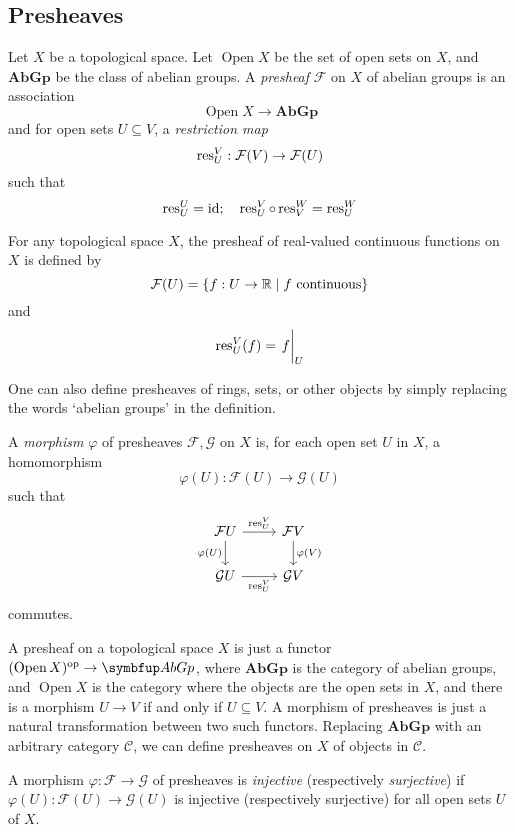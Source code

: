 \subsection{Presheaves}
\begin{definition}
    Let \( X \) be a topological space.
    Let \( \operatorname{Open} X \) be the set of open sets on \( X \), and \( \mathbf{AbGp} \) be the class of abelian groups.
    A \emph{presheaf} \( \mathcal F \) on \( X \) of abelian groups is an association
    \[ \operatorname{Open} X \to \mathbf{AbGp} \]
    and for open sets \( U \subseteq V \), a \emph{restriction map}
    \[ \operatorname{res}_U^V : \mathcal F(V) \to \mathcal F(U) \]
    such that
    \[ \operatorname{res}_U^U = \operatorname{id};\quad \operatorname{res}_U^V \circ \operatorname{res}_V^W = \operatorname{res}_U^W \]
\end{definition}
\begin{example}
    For any topological space \( X \), the presheaf of real-valued continuous functions on \( X \) is defined by
    \[ \mathcal F(U) = \qty{f : U \to \mathbb R \mid f \text{ continuous}} \]
    and
    \[ \res_U^V(f) = \eval{f}_U \]
\end{example}
One can also define presheaves of rings, sets, or other objects by simply replacing the words `abelian groups' in the definition.
\begin{definition}
    A \emph{morphism} \( \varphi \) of presheaves \( \mathcal F, \mathcal G \) on \( X \) is, for each open set \( U \) in \( X \), a homomorphism
    \[ \varphi(U) : \mathcal F(U) \to \mathcal G(U) \]
    such that
    \[\begin{tikzcd}
        {\mathcal F U} & {\mathcal F V} \\
        {\mathcal G U} & {\mathcal G V}
        \arrow["{\res_U^V}", from=1-1, to=1-2]
        \arrow["{\varphi(V)}", from=1-2, to=2-2]
        \arrow["{\varphi(U)}"', from=1-1, to=2-1]
        \arrow["{\res_U^V}"', from=2-1, to=2-2]
    \end{tikzcd}\]
    commutes.
\end{definition}
\begin{remark}
    A presheaf on a topological space \( X \) is just a functor \( (\operatorname{Open} X)^\cop \to \mathbf{AbGp} \), where \( \mathbf{AbGp} \) is the category of abelian groups, and \( \operatorname{Open} X \) is the category where the objects are the open sets in \( X \), and there is a morphism \( U \to V \) if and only if \( U \subseteq V \).
    A morphism of presheaves is just a natural transformation between two such functors.
    Replacing \( \mathbf{AbGp} \) with an arbitrary category \( \mathcal C \), we can define presheaves on \( X \) of objects in \( \mathcal C \).
\end{remark}
\begin{definition}
    A morphism \( \varphi : \mathcal F \to \mathcal G \) of presheaves is \emph{injective} (respectively \emph{surjective}) if \( \varphi(U) : \mathcal F(U) \to \mathcal G(U) \) is injective (respectively surjective) for all open sets \( U \) of \( X \).
\end{definition}

